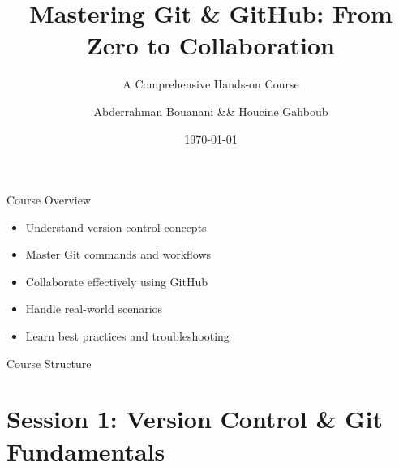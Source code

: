 \documentclass[aspectratio=169]{beamer}
\title[Git \& GitHub]{\textbf{Mastering Git \& GitHub: From Zero to Collaboration}}
\subtitle{A Comprehensive Hands-on Course}
\author{Abderrahman Bouanani \&\& Houcine Gahboub}
\institute{ENSAA}
\date{\today}
\begin{document}
\begin{frame}
  \titlepage
\end{frame}

\begin{frame}{Course Overview}
  \begin{itemize}
    \item Understand version control concepts
    \item Master Git commands and workflows
    \item Collaborate effectively using GitHub
    \item Handle real-world scenarios
    \item Learn best practices and troubleshooting
  \end{itemize}
\end{frame}

\begin{frame}{Course Structure}
  \tableofcontents
\end{frame}

\section{Session 1: Version Control \& Git Fundamentals}
\end{document}
